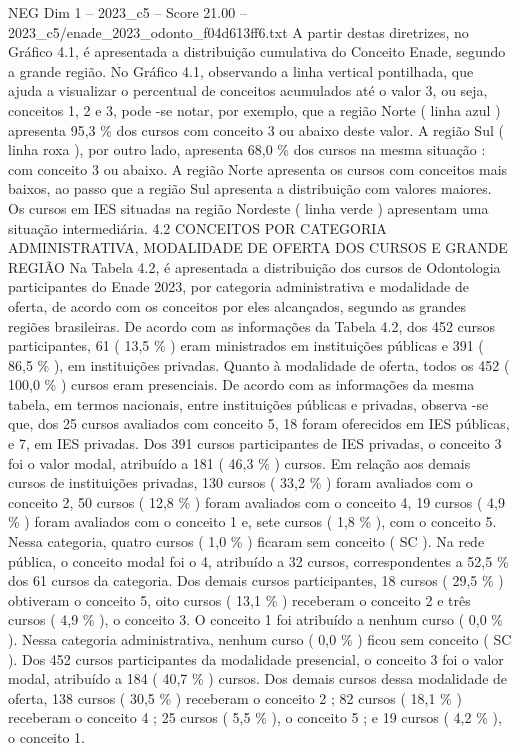 \begin{textsample}{NEG Dim 1 – 2023\_c5 – Score 21.00 – 2023\_c5/enade\_2023\_odonto\_f04d613ff6.txt}
A partir destas diretrizes, no Gráfico 4.1, é apresentada a distribuição cumulativa do Conceito Enade, segundo a grande região.
No Gráfico 4.1, observando a linha vertical pontilhada, que ajuda a visualizar o percentual de conceitos acumulados até o valor 3, ou seja, conceitos 1, 2 e 3, pode -se notar, por exemplo, que a região Norte ( linha azul ) apresenta 95,3 \% dos cursos com conceito 3 ou abaixo deste valor.
A região Sul ( linha roxa ), por outro lado, apresenta 68,0 \% dos cursos na mesma situação : com conceito 3 ou abaixo.
A região Norte apresenta os cursos com conceitos mais baixos, ao passo que a região Sul apresenta a distribuição com valores maiores.
Os cursos em IES situadas na região Nordeste ( linha verde ) apresentam uma situação intermediária. 4.2 CONCEITOS POR CATEGORIA ADMINISTRATIVA, MODALIDADE DE OFERTA DOS CURSOS E GRANDE REGIÃO Na Tabela 4.2, é apresentada a distribuição dos cursos de Odontologia participantes do Enade 2023, por categoria administrativa e modalidade de oferta, de acordo com os conceitos por eles alcançados, segundo as grandes regiões brasileiras.
De acordo com as informações da Tabela 4.2, dos 452 cursos participantes, 61 ( 13,5 \% ) eram ministrados em instituições públicas e 391 ( 86,5 \% ), em instituições privadas.
Quanto à modalidade de oferta, todos os 452 ( 100,0 \% ) cursos eram presenciais.
De acordo com as informações da mesma tabela, em termos nacionais, entre instituições públicas e privadas, observa -se que, dos 25 cursos avaliados com conceito 5, 18 foram oferecidos em IES públicas, e 7, em IES privadas.
Dos 391 cursos participantes de IES privadas, o conceito 3 foi o valor modal, atribuído a 181 ( 46,3 \% ) cursos.
Em relação aos demais cursos de instituições privadas, 130 cursos ( 33,2 \% ) foram avaliados com o conceito 2, 50 cursos ( 12,8 \% ) foram avaliados com o conceito 4, 19 cursos ( 4,9 \% ) foram avaliados com o conceito 1 e, sete cursos ( 1,8 \% ), com o conceito 5.
Nessa categoria, quatro cursos ( 1,0 \% ) ficaram sem conceito ( SC ).
Na rede pública, o conceito modal foi o 4, atribuído a 32 cursos, correspondentes a 52,5 \% dos 61 cursos da categoria.
Dos demais cursos participantes, 18 cursos ( 29,5 \% ) obtiveram o conceito 5, oito cursos ( 13,1 \% ) receberam o conceito 2 e três cursos ( 4,9 \% ), o conceito 3.
O conceito 1 foi atribuído a nenhum curso ( 0,0 \% ).
Nessa categoria administrativa, nenhum curso ( 0,0 \% ) ficou sem conceito ( SC ).
Dos 452 cursos participantes da modalidade presencial, o conceito 3 foi o valor modal, atribuído a 184 ( 40,7 \% ) cursos.
Dos demais cursos dessa modalidade de oferta, 138 cursos ( 30,5 \% ) receberam o conceito 2 ; 82 cursos ( 18,1 \% ) receberam o conceito 4 ; 25 cursos ( 5,5 \% ), o conceito 5 ; e 19 cursos ( 4,2 \% ), o conceito 1.

\end{textsample}
